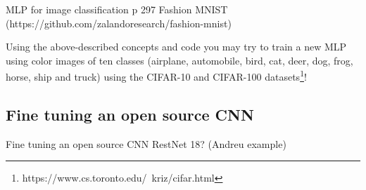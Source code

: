 MLP for image classification p 297   Fashion MNIST (https://github.com/zalandoresearch/fashion-mnist)


Using the above-described concepts and code you may try to train a new MLP using color images of ten classes (airplane, automobile, bird, cat, deer, dog, frog, horse, ship and truck) using the CIFAR-10 and CIFAR-100 datasets\footnote{https://www.cs.toronto.edu/~kriz/cifar.html}!


\subsection{Fine tuning an open source CNN}
\label{subsec:tuning}

Fine tuning an open source CNN   RestNet 18? (Andreu example)
